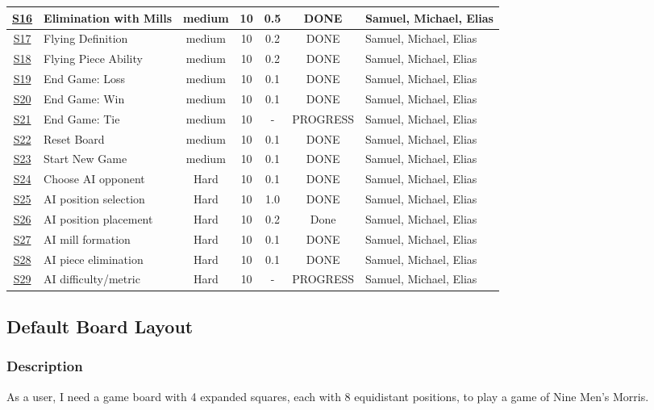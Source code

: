 \documentclass[11pt]{article}
\begin{document}
\begin{center}
\begin{tabular}{|c|m{3.5cm}|c|c|c|c|m{2.0cm}|}
\hline
\hyperref[sec:orgeab77bb]{S16} & Elimination with Mills & medium & 10 & 0.5 & DONE & Samuel, Michael, Elias\\
\hline
\hyperref[sec:org488bf16]{S17} & Flying Definition & medium & 10 & 0.2 & DONE & Samuel, Michael, Elias\\
\hline
\hyperref[sec:orgf90a935]{S18} & Flying Piece Ability & medium & 10 & 0.2 & DONE & Samuel, Michael, Elias\\
\hline
\hyperref[sec:org62411b7]{S19} & End Game: Loss & medium & 10 & 0.1 & DONE & Samuel, Michael, Elias\\
\hline
\hyperref[sec:org32956f8]{S20} & End Game: Win & medium & 10 & 0.1 & DONE & Samuel, Michael, Elias\\
\hline
\hyperref[sec:orgbe95978]{S21} & End Game: Tie & medium & 10 & - & PROGRESS & Samuel, Michael, Elias\\
\hline
\hyperref[sec:org5e90d2f]{S22} & Reset Board & medium & 10 & 0.1 & DONE & Samuel, Michael, Elias\\
\hline
\hyperref[sec:orgc7da472]{S23} & Start New Game & medium & 10 & 0.1 & DONE & Samuel, Michael, Elias\\
\hline
\hyperref[sec:org7f9a07f]{S24} & Choose AI opponent & Hard & 10 & 0.1 & DONE & Samuel, Michael, Elias\\
\hline
\hyperref[sec:org5cd5738]{S25} & AI position selection & Hard & 10 & 1.0 & DONE & Samuel, Michael, Elias\\
\hline
\hyperref[sec:orgca7949c]{S26} & AI position placement & Hard & 10 & 0.2 & Done & Samuel, Michael, Elias\\
\hline
\hyperref[sec:orga31eb98]{S27} & AI mill formation & Hard & 10 & 0.1 & DONE & Samuel, Michael, Elias\\
\hline
\hyperref[sec:org589ee2d]{S28} & AI piece elimination & Hard & 10 & 0.1 & DONE & Samuel, Michael, Elias\\
\hline
\hyperref[sec:org4e32353]{S29} & AI difficulty/metric & Hard & 10 & - & PROGRESS & Samuel, Michael, Elias\\
\end{tabular}
\end{center}

\subsection{Default Board Layout}
\label{sec:org2940434}
\subsubsection*{Description}
\label{sec:orgbe9845d}
As a user, I need a game board with 4 expanded squares, each with 8 equidistant positions, to
play a game of Nine Men's Morris.
\end{document}
